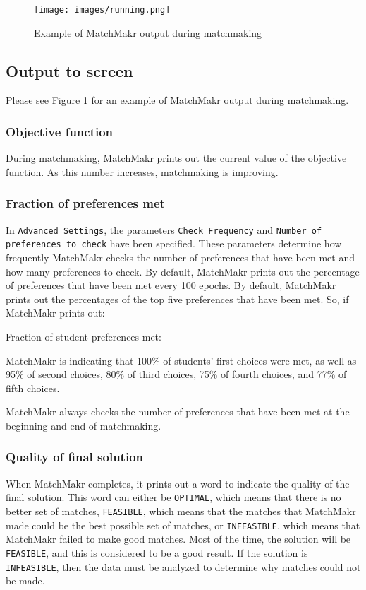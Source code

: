 \begin{figure}
	\centering
	\texttt{[image: images/running.png]}
	\caption{\label{fig:running} Example of MatchMakr output during matchmaking}
\end{figure}

\subsection{Output to screen}
Please see Figure \ref{fig:running} for an example of MatchMakr output during matchmaking.

\subsubsection{Objective function}
During matchmaking, MatchMakr prints out the current value of the objective function.  As this number increases, matchmaking is improving.

\subsubsection{Fraction of preferences met}
In \texttt{Advanced Settings}, the parameters \texttt{Check Frequency} and \texttt{Number of preferences to check} have been specified.  These parameters determine how frequently MatchMakr checks the number of preferences that have been met and how many preferences to check.  By default, MatchMakr prints out the percentage of preferences that have been met every 100 epochs.  By default, MatchMakr prints out the percentages of the top five preferences that have been met.  So, if MatchMakr prints out:


Fraction of student preferences met: \\
\left[1.0, 0.95, 0.8, 0.75, 0.77\right]


MatchMakr is indicating that 100\% of students' first choices were met, as well as 95\% of second choices, 80\% of third choices, 75\% of fourth choices, and 77\% of fifth choices.

MatchMakr always checks the number of preferences that have been met at the beginning and end of matchmaking.

\subsubsection{Quality of final solution}
When MatchMakr completes, it prints out a word to indicate the quality of the final solution.  This word can either be \texttt{OPTIMAL}, which means that there is no better set of matches, \texttt{FEASIBLE}, which means that the matches that MatchMakr made could be the best possible set of matches, or \texttt{INFEASIBLE}, which means that MatchMakr failed to make good matches.  Most of the time, the solution will be \texttt{FEASIBLE}, and this is considered to be a good result.  If the solution is \texttt{INFEASIBLE}, then the data must be analyzed to determine why matches could not be made.

